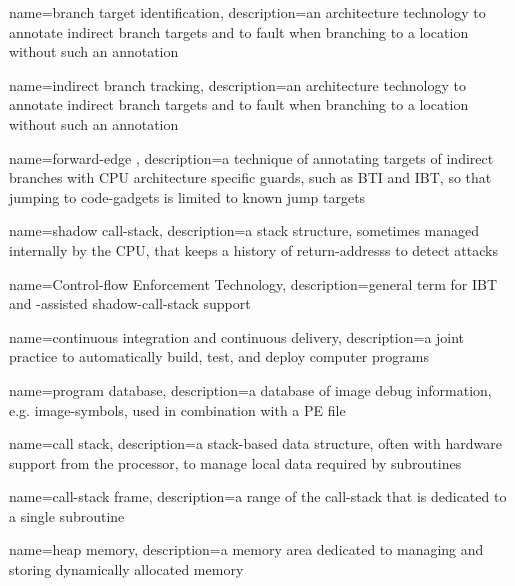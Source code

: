 {
  name={branch target identification},
  description={an  architecture technology to annotate indirect branch targets and to fault when branching to a location without such an annotation}
}

{
  name={indirect branch tracking},
  description={an  architecture technology to annotate indirect branch targets and to fault when branching to a location without such an annotation}
}

{
  name={forward-edge },
  description={a technique of annotating targets of indirect branches with \gls{CPU} architecture specific guards, such as \gls{BTI} and \gls{IBT}, so that jumping to \glspl{code-gadget} is limited to known jump targets}
}

{
  name={shadow \gls{call-stack}},
  description={a stack structure, sometimes managed internally by the \gls{CPU}, that keeps a history of \glspl{return-address} to detect  attacks}
}

{
  name={Control-flow Enforcement Technology},
  description={general term for  \gls{IBT} and -assisted \gls{shadow-call-stack} support}
}

{
  name={continuous integration and continuous delivery},
  description={a joint practice to automatically build, test, and deploy computer programs}
}

{
  name={program database},
  description={a database of \gls{image} debug information, e.g. \glspl{image-symbol}, used in combination with a \gls{PE} file}
}

{
  name={call stack},
  description={a stack-based data structure, often with hardware support from the processor, to manage local data required by subroutines}
}

{
  name={\gls{call-stack} frame},
  description={a range of the \gls{call-stack} that is dedicated to a single subroutine}
}

{
  name={heap memory},
  description={a memory area dedicated to managing and storing dynamically allocated memory}
}

